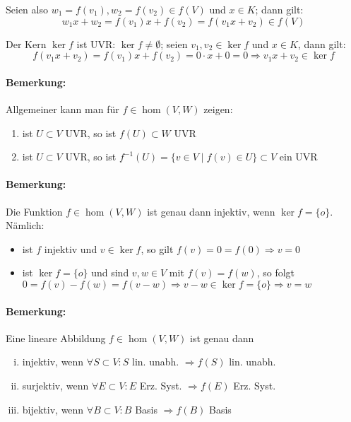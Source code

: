 	Seien also $w_1 = f(v_1), w_2 = f(v_2) \in f(V)$ und $x\in K$; dann gilt:
		\begin{equation*}
			w_1x+w_2 = f(v_1)x+f(v_2) = f(v_1x+v_2)\in f(V)
		\end{equation*}
		
	Der Kern $\ker f$ ist UVR: $\ker f\neq \emptyset$; seien $v_1,v_2\in \ker f$ und $x\in K$, dann gilt:
		\begin{equation*}
			f(v_1x+v_2) = f(v_1)x+f(v_2) = 0\cdot x + 0 = 0 \Rightarrow v_1x+v_2\in \ker f
		\end{equation*}
\paragraph{Bemerkung: }
	Allgemeiner kann man für $f\in \hom (V,W)$ zeigen:
		\begin{enumerate}
			\item ist $U\subset V$ UVR, so ist $f(U)\subset W$ UVR
			\item ist $U\subset V$ UVR, so ist $f^{-1}(U) = \{v\in V\mid f(v) \in U \}\subset V$ ein UVR
		\end{enumerate}
		
\paragraph{Bemerkung: }
	Die Funktion $f\in \hom (V,W)$ ist genau dann injektiv, wenn $\ker f = \{o\}$. Nämlich:
		\begin{itemize}
			\item ist $f$ injektiv und $v\in \ker f$, so gilt $f(v) = 0 = f(0) \Rightarrow v=0$
			\item ist $\ker f = \{ o \}$ und sind $v,w \in V$ mit $f(v) = f(w)$, so folgt\\
				$0=f(v)-f(w) = f(v-w) \Rightarrow v-w\in \ker f = \{o\} \Rightarrow v = w$
		\end{itemize}

\paragraph{Bemerkung: }
	Eine lineare Abbildung $ f\in \hom (V,W) $ ist genau dann
		\begin{enumerate}[(i)]
			\item injektiv, wenn $ \forall S\subset V: S$ lin. unabh. $ \Rightarrow f(S) $ lin. unabh.
			\item surjektiv, wenn $ \forall E \subset V:E $ Erz. Syst. $ \Rightarrow f(E)$ Erz. Syst.
			\item bijektiv, wenn $ \forall B\subset V: B$ Basis $ \Rightarrow f(B)$ Basis
		\end{enumerate}

